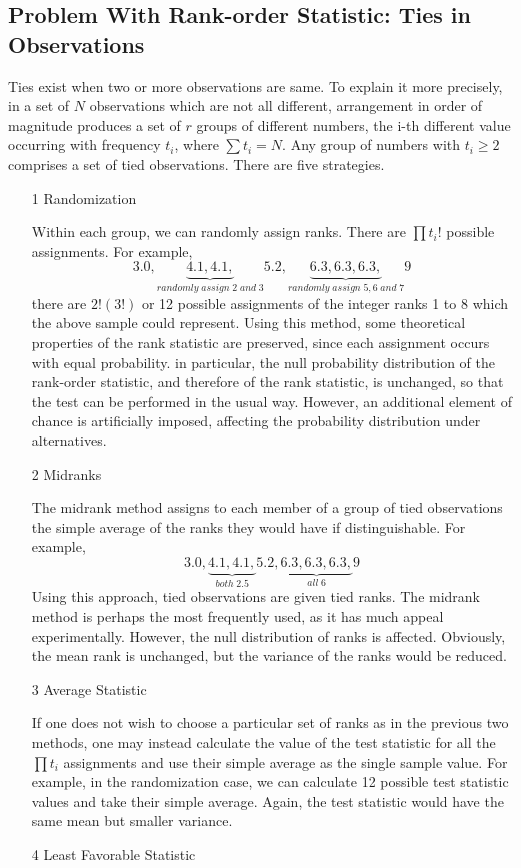 \documentclass[twoside]{article}
\begin{document}
\subsection{Problem With Rank-order Statistic: Ties in Observations}
Ties exist when two or more observations are same. To explain it more precisely, in a set of $N$ observations which are not all different, arrangement in order of magnitude produces a set of $r$ groups of different numbers, the i-th different value occurring with frequency $t_i$, where $\sum t_i = N$. Any group of numbers with $t_i \geqslant 2$ comprises a set of tied observations. There are five strategies. 
\begin{itemize}
	\item[1] Randomization
	
	Within each group, we can randomly assign ranks. There are $\prod t_i!$ possible assignments. For example, 
	$$
	3.0, \underbrace{4.1, 4.1, }_{randomly \; assign \; 2 \; and \; 3} 5.2, \underbrace{6.3, 6.3, 6.3, }_{randomly \; assign \; 5, 6 \; and \; 7} 9
	$$
	there are $2!(3!)$ or 12 possible assignments of the integer ranks 1 to 8 which the above sample could represent. Using this method, some theoretical properties of the rank statistic are preserved, since each assignment occurs with equal probability. in particular, the null probability distribution of the rank-order statistic, and therefore of the rank statistic, is unchanged, so that the test can be performed in the usual way. However, an additional element of chance is artificially imposed, affecting the probability distribution under alternatives. 
	\item[2] Midranks
	
	The midrank method assigns to each member of a group of tied observations the simple average of the ranks they would have if distinguishable. For example, 
	$$
	3.0, \underbrace{4.1, 4.1, }_{both \; 2.5} 5.2, \underbrace{6.3, 6.3, 6.3, }_{all \; 6} 9
	$$
	Using this approach, tied observations are given tied ranks. The midrank method is perhaps the most frequently used, as it has much appeal experimentally. However, the null distribution of ranks is affected. Obviously, the mean rank is unchanged, but the variance of the ranks would be reduced. 
	\item[3] Average Statistic
	
	If one does not wish to choose a particular set of ranks as in the previous two methods, one may instead calculate the value of the test statistic for all the $\prod t_i$ assignments and use their simple average as the single sample value. For example, in the randomization case, we can calculate 12 possible test statistic values and take their simple average. Again, the test statistic would have the same mean but smaller variance. 
	\item[4] Least Favorable Statistic
	

\end{itemize}
\end{document}
